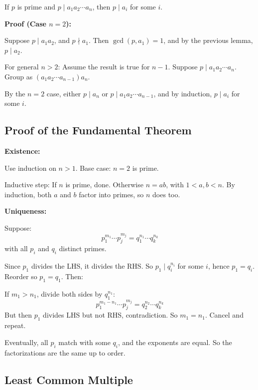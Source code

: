 If \(p\) is prime and \(p \mid a_1a_2 \cdots a_n\), then \(p \mid a_i\) for some \(i\).
\vspace{\baselineskip}

\textbf{Proof (Case \(n=2\)):} 

Suppose \(p \mid a_1a_2\), and \(p \nmid a_1\).
Then \(\gcd(p, a_1) = 1\), and by the previous lemma, \(p \mid a_2\).

For general \(n > 2\): Assume the result is true for \(n-1\). Suppose \(p \mid a_1a_2 \cdots a_n\).
Group as \((a_1a_2 \cdots a_{n-1})a_n\).

By the \(n=2\) case, either \(p \mid a_n\) or \(p \mid a_1a_2 \cdots a_{n-1}\), and by induction, \(p \mid a_i\) for some \(i\).

\QED

\subsection{Proof of the Fundamental Theorem}

\textbf{Existence:}

Use induction on \(n > 1\).
Base case: \(n = 2\) is prime.
\vspace{\baselineskip}

Inductive step: If \(n\) is prime, done. Otherwise \(n = ab\), with \(1 < a, b < n\).
By induction, both \(a\) and \(b\) factor into primes, so \(n\) does too.
\vspace{\baselineskip}

\textbf{Uniqueness:}

Suppose:
\[
	p_1^{m_1} \cdots p_j^{m_j} = q_1^{n_1} \cdots q_k^{n_k}
\]
with all \(p_i\) and \(q_i\) distinct primes.
\vspace{\baselineskip}

Since \(p_1\) divides the LHS, it divides the RHS. So \(p_1 \mid q_i^{n_i}\) for some \(i\), hence \(p_1 = q_i\).
Reorder so \(p_1 = q_1\). Then:

If \(m_1 > n_1\), divide both sides by \(q_1^{n_1}\):
\[
	p_1^{m_1-n_1} \cdots p_j^{m_j} = q_2^{n_2} \cdots q_k^{n_k}
\]
But then \(p_1\) divides LHS but not RHS, contradiction. So \(m_1 = n_1\). Cancel and repeat.

Eventually, all \(p_i\) match with some \(q_i\), and the exponents are equal. So the factorizations are the same up to order.

\QED

\subsection{Least Common Multiple}

